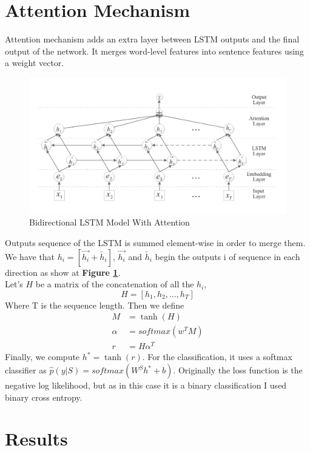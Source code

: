 \section{Attention Mechanism}
Attention mechanism\cite{zhou-etal-2016-attention,Vaswani2017AttentionIA} adds an extra layer between LSTM outputs and the final output of the network. It merges word-level features into sentence features using a weight vector. \\
\begin{figure}
 \centering
 \includegraphics[width=\textwidth]{images/chapitre4/attention.png}
 \caption{Bidirectional LSTM Model With Attention}
 \label{fig:chap4:attention}
\end{figure}
Outputs sequence of the LSTM is summed element-wise in order to merge them. We have that $h_i = [\overrightarrow{h_i} + \overleftarrow{h_i}]$, $\overrightarrow{h_i}$ and $\overleftarrow{h_i}$ begin the outputs i of sequence in each direction as show at \textbf{Figure \ref{fig:chap4:attention}}.\\
Let’s $H$ be a matrix of the concatenation of all the $h_i$, 
\begin{equation}
 H = [h_1,h_2,...,h_T]
\end{equation}
Where T is the sequence length. 
Then we define 
\begin{align}
 M &= \tanh(H)\\
 \alpha &= softmax(w^TM) \\
 r &= H \alpha^T 
\end{align}
Finally, we compute $h^* = \tanh(r)$.
For the classification, it uses a softmax classifier as $\hat{p}(y|S) = softmax(W^Sh^* + b)$. Originally the loss function is the negative log likelihood, but as in this case it is a binary classification I used binary cross entropy. 
\section{Results}
